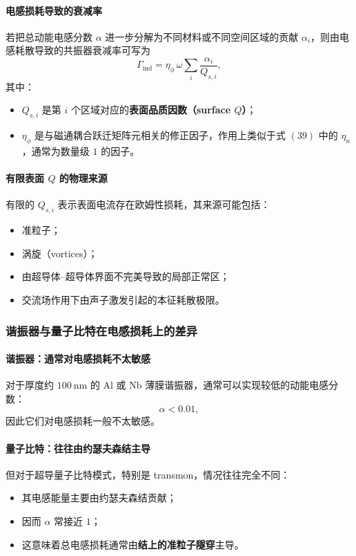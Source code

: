 \documentclass[12pt,a4paper,oneside]{ctexbook}
\begin{document}
\paragraph{电感损耗导致的衰减率}
若把总动能电感分数 \(\alpha\) 进一步分解为不同材料或不同空间区域的贡献 \(\alpha_i\)，则由电感耗散导致的共振器衰减率可写为
\begin{equation}
\Gamma_{\mathrm{ind}}=\eta_\phi\,\omega \sum_i \frac{\alpha_i}{Q_{s,i}},
\tag{40}
\end{equation}
其中：
\begin{itemize}
    \item \(Q_{s,i}\) 是第 \(i\) 个区域对应的\textbf{表面品质因数（surface \(Q\)）}；
    \item \(\eta_\phi\) 是与磁通耦合跃迁矩阵元相关的修正因子，作用上类似于式 \((39)\) 中的 \(\eta_n\)，通常为数量级 \(1\) 的因子。
\end{itemize}

\paragraph{有限表面 \(Q\) 的物理来源}
有限的 \(Q_{s,i}\) 表示表面电流存在欧姆性损耗，其来源可能包括：
\begin{itemize}
    \item 准粒子；
    \item 涡旋（vortices）；
    \item 由超导体--超导体界面不完美导致的局部正常区；
    \item 交流场作用下由声子激发引起的本征耗散极限。
\end{itemize}

\subsubsection{谐振器与量子比特在电感损耗上的差异}

\paragraph{谐振器：通常对电感损耗不太敏感}
对于厚度约 \(100~\mathrm{nm}\) 的 Al 或 Nb 薄膜谐振器，通常可以实现较低的动能电感分数：
\[
\alpha < 0.01,
\]
因此它们对电感损耗一般不太敏感。

\paragraph{量子比特：往往由约瑟夫森结主导}
但对于超导量子比特模式，特别是 transmon，情况往往完全不同：
\begin{itemize}
    \item 其电感能量主要由约瑟夫森结贡献；
    \item 因而 \(\alpha\) 常接近 \(1\)；
    \item 这意味着总电感损耗通常由\textbf{结上的准粒子隧穿}主导。
\end{itemize}
\end{document}
